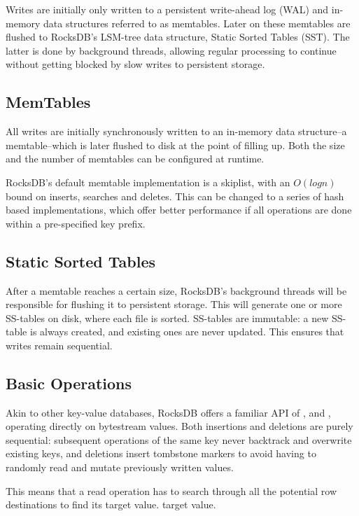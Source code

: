 \documentclass[b5paper]{report}
\begin{document}
Writes are initially only written to a persistent write-ahead log (WAL) and
in-memory data structures referred to as memtables. Later on these memtables are
flushed to RocksDB's LSM-tree data structure, Static Sorted Tables (SST). The
latter is done by background threads, allowing regular processing to continue
without getting blocked by slow writes to persistent storage.


\subsection{MemTables}
All writes are initially synchronously written to an in-memory data structure--a
memtable--which is later flushed to disk at the point of filling up. Both the
size and the number of memtables can be configured at runtime.

RocksDB's default memtable implementation is a skiplist, with an $ O(log n) $
bound on inserts, searches and deletes. This can be changed to a series of hash
based implementations, which offer better performance if all operations are done
within a pre-specified key prefix.

\subsection{Static Sorted Tables}
After a memtable reaches a certain size, RocksDB's background threads will be
responsible for flushing it to persistent storage. This will generate one or
more SS-tables on disk, where each file is sorted. SS-tables are immutable: a
new SS-table is always created, and existing ones are never updated. This
ensures that writes remain sequential.

\subsection{Basic Operations}
Akin to other key-value databases, RocksDB offers a familiar API of
,  and , operating
directly on bytestream values. Both insertions and deletions are purely
sequential: subsequent  operations of the same key never backtrack and
overwrite existing keys, and deletions insert tombstone markers to avoid having
to randomly read and mutate previously written values.

This means that a read operation has to search through all the potential row
destinations to find its target value.
target value.
\end{document}
